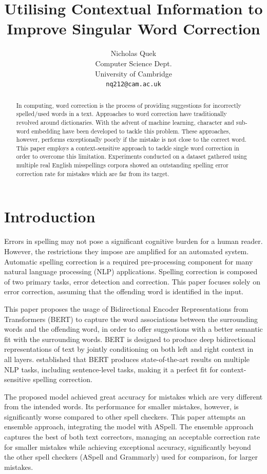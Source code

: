 \documentclass[11pt,a4paper]{article}
\title{Utilising Contextual Information to Improve Singular Word Correction}
\author{Nicholas Quek \\
  Computer Science Dept.\\
  University of Cambridge\\
  {\tt nq212@cam.ac.uk} }
\date{}
\begin{document}
\maketitle
\begin{abstract}
In computing, word correction is the process of providing suggestions for incorrectly spelled/used words in a text. Approaches to word correction have traditionally revolved around dictionaries. With the advent of machine learning, character and sub-word embedding have been developed to tackle this problem. These approaches, however, performs exceptionally poorly if the mistake is not close to the correct word. This paper employs a context-sensitive approach to tackle single word correction in order to overcome this limitation. Experiments conducted on a dataset gathered using multiple real English misspellings corpora showed an outstanding spelling error correction rate for mistakes which are far from its target.
\end{abstract}

\section{Introduction}

Errors in spelling may not pose a significant cognitive burden for a human reader. However, the restrictions they impose are amplified for an automated system. Automatic spelling correction is a required pre-processing component for many natural language processing (NLP) applications. Spelling correction is composed of two primary tasks, error detection and correction. This paper focuses solely on error correction, assuming that the offending word is identified in the input. 

This paper proposes the usage of Bidirectional Encoder Representations from Transformers (BERT) \cite{bert} to capture the word associations between the surrounding words and the offending word, in order to offer suggestions with a better semantic fit with the surrounding words. BERT is designed to produce deep bidirectional representations of text by jointly conditioning on both left and right context in all layers. \citet{bert} established that BERT produces state-of-the-art results on multiple NLP tasks, including sentence-level tasks, making it a perfect fit for context-sensitive spelling correction.

The proposed model achieved great accuracy for mistakes which are very different from the intended words. Its performance for smaller mistakes, however, is significantly worse compared to other spell checkers. This paper attempts an ensemble approach, integrating the model with ASpell. The ensemble approach captures the best of both text correctors, managing an acceptable correction rate for smaller mistakes while achieving exceptional accuracy, significantly beyond the other spell checkers (ASpell and Grammarly) used for comparison, for larger mistakes.
\end{document}
